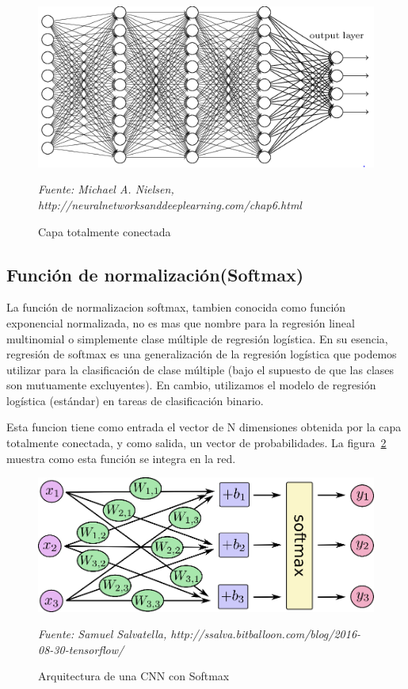 \begin{figure}[H]
		\centering
		\includegraphics[width=120mm]{Imagenes/grafico_full_conect.png}
		\caption{Capa totalmente conectada}
		\vspace{0.15cm}
		\textit{Fuente: Michael A. Nielsen, http://neuralnetworksanddeeplearning.com/chap6.html}
		\label{fig:grafico_full_conect}
\end{figure}

\subsection{Función de normalización(Softmax)}
\label{sub:softmax}
La función de normalizacion softmax, tambien conocida como función exponencial normalizada, no es mas que nombre para la regresión lineal multinomial o simplemente clase múltiple de regresión logística. En su esencia, regresión de softmax es una generalización de la regresión logística que podemos utilizar para la clasificación de clase múltiple (bajo el supuesto de que las clases son mutuamente excluyentes). En cambio, utilizamos el modelo de regresión logística (estándar) en tareas de clasificación binario. 

Esta funcion tiene como entrada el vector de N dimensiones obtenida por la capa totalmente conectada, y como salida, un vector de probabilidades. La figura~\ref{fig:arquitectura_cnn_softmax} muestra como esta función se integra en la red. 

\begin{figure}[H]
		\centering
		\includegraphics[width=120mm]{Imagenes/arquitectura_cnn_softmax.png}
		\caption{Arquitectura de una CNN con Softmax}
		\vspace{0.15cm}
		\textit{Fuente: Samuel Salvatella, http://ssalva.bitballoon.com/blog/2016-08-30-tensorflow/}
		\label{fig:arquitectura_cnn_softmax}
\end{figure}


